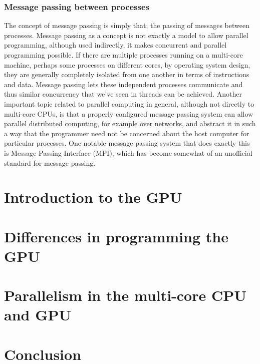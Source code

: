 \documentclass[a4paper,11pt]{article}
\begin{document}
\subsubsection{Message passing between processes} %
\label{ssub:message_passing_between_processes}
The concept of message passing is simply that; the passing of messages between processes. Message passing as a concept is
not exactly a model to allow parallel programming, although used indirectly, it makes concurrent and parallel programming
possible. If there are multiple processes running on a multi-core machine, perhaps some processes on different cores, by
operating system design, they are generally completely isolated from one another in terms of instructions and data. Message
passing lets these independent processes communicate and thus similar concurrency that we've seen in threads can be achieved.
Another important topic related to parallel computing in general, although not directly to multi-core CPUs, is that a
properly configured message passing system can allow parallel distributed computing, for example over networks, and abstract
it in such a way that the programmer need not be concerned about the host computer for particular processes. One notable
message passing system that does exactly this is Message Passing Interface (MPI), which has become somewhat of an unofficial
standard for message passing.





\section{Introduction to the GPU} %
\label{sec:introduction_to_the_gpu}



\section{Differences in programming the GPU} %
\label{sec:differences_in_programming_the_gpu}



\section{Parallelism in the multi-core CPU and GPU} %
\label{sec:parallelism_in_the_multi_core_cpu_and_gpu}



\section{Conclusion} %
\label{sec:conclusion}





\end{document}
